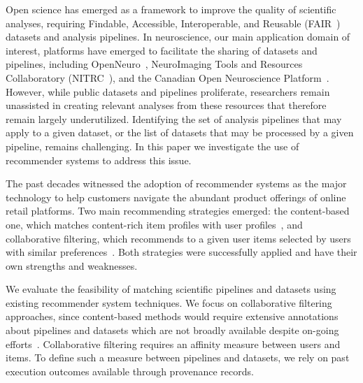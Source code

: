 \documentclass[conference]{IEEEtran}
\begin{document}
Open science has emerged as a framework to improve the quality of
scientific analyses, requiring Findable, Accessible, Interoperable, and
Reusable (FAIR~\cite{wilkinson2016fair}) datasets and analysis pipelines. In
neuroscience, our main application domain of interest, platforms have
emerged to facilitate the sharing of datasets and pipelines, including
OpenNeuro~\cite{gorgolewski2017openneuro}, NeuroImaging Tools and Resources Collaboratory (NITRC~\cite{kennedy2016nitrc}), and the Canadian Open
Neuroscience Platform~\cite{Jean-Baptiste2020}. However, while public
datasets and pipelines proliferate, researchers remain unassisted in
creating relevant analyses from these resources that therefore remain
largely underutilized. Identifying the set of analysis pipelines that may
apply to a given dataset, or the list of datasets that may be processed by
a given pipeline, remains challenging. In this paper we investigate
the use of recommender systems to address this issue.


The past decades witnessed the adoption of recommender systems as the major
 technology to help customers navigate the abundant product offerings of
 online retail platforms. Two main
 recommending strategies emerged: the content-based one, which matches
 content-rich item profiles with user profiles~\cite{pazzani2007content},
 and collaborative filtering, which recommends to a given user items
 selected by users with similar preferences~\cite{rajaraman2011mining}.
 Both strategies were successfully applied and have their own strengths and
 weaknesses.
 
 We evaluate the feasibility of matching scientific pipelines and datasets
 using existing recommender system techniques. We focus on collaborative
 filtering approaches, since content-based methods would require extensive
 annotations about pipelines and datasets which are not broadly available
 despite on-going
 efforts~\cite{NeuroimagingDataModel,sansone2017dats,DATSDocumentation}.
 Collaborative filtering requires an affinity measure
 between users and items. To define such a measure between pipelines and
 datasets, we rely on past execution outcomes available through provenance
 records.
\end{document}
